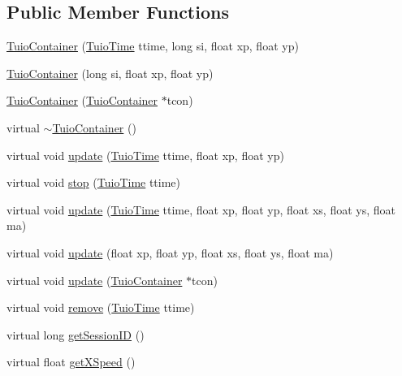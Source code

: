 \subsection*{Public Member Functions}
\begin{DoxyCompactItemize}
\item 
\hyperlink{class_t_u_i_o_1_1_tuio_container_a970e6fa8eefc231dccf75d11b68c289d}{Tuio\+Container} (\hyperlink{class_t_u_i_o_1_1_tuio_time}{Tuio\+Time} ttime, long si, float xp, float yp)
\item 
\hyperlink{class_t_u_i_o_1_1_tuio_container_a24a9a597f56b688c8c5f183dd2679ac9}{Tuio\+Container} (long si, float xp, float yp)
\item 
\hyperlink{class_t_u_i_o_1_1_tuio_container_acc649d355b9729d0150854e95e1bbef7}{Tuio\+Container} (\hyperlink{class_t_u_i_o_1_1_tuio_container}{Tuio\+Container} $\ast$tcon)
\item 
virtual \hyperlink{class_t_u_i_o_1_1_tuio_container_a032e09099181219f292f404eeaf282f0}{$\sim$\+Tuio\+Container} ()
\item 
virtual void \hyperlink{class_t_u_i_o_1_1_tuio_container_a20d5b3bd52eb41a58c313cc8ceda68c0}{update} (\hyperlink{class_t_u_i_o_1_1_tuio_time}{Tuio\+Time} ttime, float xp, float yp)
\item 
virtual void \hyperlink{class_t_u_i_o_1_1_tuio_container_a250b4a7c140178c3585aa5b957b34d73}{stop} (\hyperlink{class_t_u_i_o_1_1_tuio_time}{Tuio\+Time} ttime)
\item 
virtual void \hyperlink{class_t_u_i_o_1_1_tuio_container_a5ce41488a3ad8ea6c333a0acdeb69f9a}{update} (\hyperlink{class_t_u_i_o_1_1_tuio_time}{Tuio\+Time} ttime, float xp, float yp, float xs, float ys, float ma)
\item 
virtual void \hyperlink{class_t_u_i_o_1_1_tuio_container_a8d2a672d4403531d112cac6f8fa6d7bc}{update} (float xp, float yp, float xs, float ys, float ma)
\item 
virtual void \hyperlink{class_t_u_i_o_1_1_tuio_container_a83eeea12e96ea1305fe663624d22d471}{update} (\hyperlink{class_t_u_i_o_1_1_tuio_container}{Tuio\+Container} $\ast$tcon)
\item 
virtual void \hyperlink{class_t_u_i_o_1_1_tuio_container_add021522fdc99f2b85d6f9b1903a427e}{remove} (\hyperlink{class_t_u_i_o_1_1_tuio_time}{Tuio\+Time} ttime)
\item 
virtual long \hyperlink{class_t_u_i_o_1_1_tuio_container_a84c29bb63b233dbfd22811dab5b62833}{get\+Session\+ID} ()
\item 
virtual float \hyperlink{class_t_u_i_o_1_1_tuio_container_acbb84622fb4d29c81adefac64e119bec}{get\+X\+Speed} ()

\end{DoxyCompactItemize}
